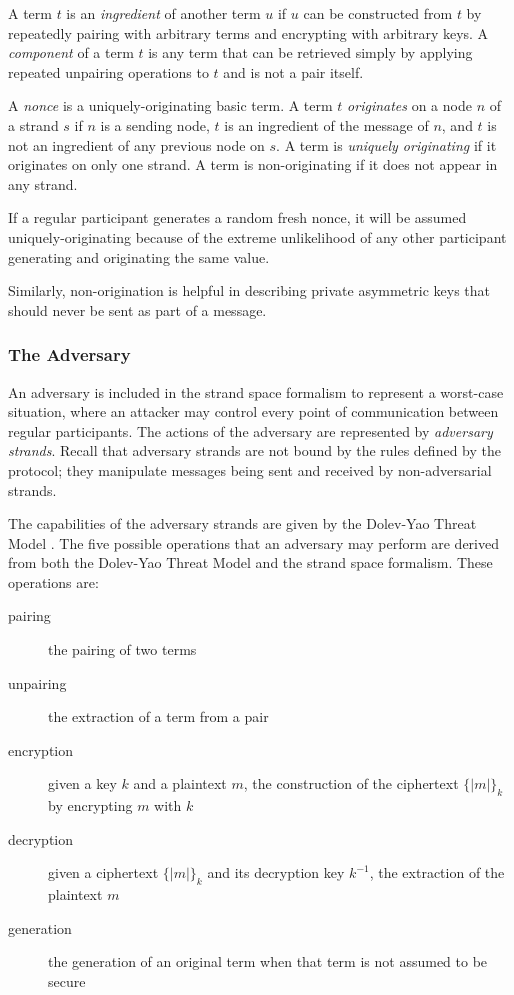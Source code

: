 			A term $t$ is an \emph{ingredient} of another term $u$ if $u$ can
			be constructed from $t$ by repeatedly pairing with arbitrary terms
			and encrypting with arbitrary keys. A \emph{component} of a term
			$t$ is any term that can be retrieved simply by applying repeated
			unpairing operations to $t$ and is not a pair itself.

			A \emph{nonce} is a uniquely-originating basic term. A term $t$
			\emph{originates} on a node $n$ of a strand $s$ if $n$ is a sending
			node, $t$ is an ingredient of the message of $n$, and $t$ is not an
			ingredient of any previous node on $s$. A term is \emph{uniquely
			originating} if it originates on only one strand. A term is
			non-originating if it does not appear in any strand.

			If a regular participant generates a random fresh nonce, it will be
			assumed uniquely-originating because of the extreme unlikelihood of
			any other participant generating and originating the same value.

			Similarly, non-origination is helpful in describing private
			asymmetric keys that should never be sent as part of a message.

		\subsubsection{The Adversary}
		\label{sec:application.the_adversary}

			An adversary is included in the strand space formalism to represent
			a worst-case situation, where an attacker may control every point
			of communication between regular participants. The actions of the
			adversary are represented by \emph{adversary strands}. Recall that
			adversary strands are not bound by the rules defined by the
			protocol; they manipulate messages being sent and received by
			non-adversarial strands.

			The capabilities of the adversary strands are given by the
			Dolev-Yao Threat Model \cite{DolevYao83}. The five possible
			operations that an adversary may perform are derived from both the
			Dolev-Yao Threat Model and the strand space formalism. These
			operations are:

			\begin{description}
			\item [pairing] the pairing of two terms
			\item [unpairing] the extraction of a term from a pair
			\item [encryption] given a key $k$ and a plaintext $m$, the construction of the ciphertext $\{|m|\}_k$ by encrypting $m$ with $k$
			\item [decryption] given a ciphertext $\{|m|\}_k$ and its decryption key $k^{-1}$, the extraction of the plaintext $m$
			\item [generation] the generation of an original term when that term is not assumed to be secure
			\end{description}

